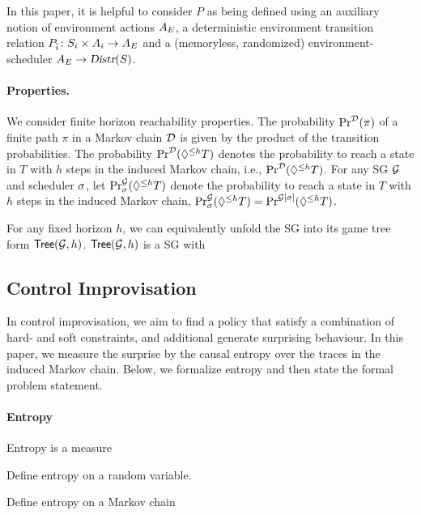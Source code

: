 In this paper, it is helpful to consider $P$ as being defined using an auxiliary notion of environment actions $A_E$, a deterministic environment transition relation $P_{\hat{i}}\colon S_i \times A_i \rightarrow A_E$ and a (memoryless, randomized) environment-scheduler $A_E \rightarrow \textsl{Distr}(S)$.

\paragraph{Properties.}
We consider finite horizon reachability properties.
The probability $\Pr^{\mathcal{D}}(\pi)$ of a finite path $\pi$ in a Markov chain $\mathcal{D}$ is given by the product of the transition probabilities. The probability $\Pr^{\mathcal{D}}(\lozenge^{\leq h} T)$ denotes the probability to reach a state in $T$ with $h$ steps in the induced Markov chain, i.e., $\Pr^{\mathcal{D}}(\lozenge^{\leq h} T)$.
For any SG $\mathcal{G}$ and scheduler $\sigma$, let $\Pr^{\mathcal{G}}_\sigma(\lozenge^{\leq h} T)$ denote the probability to reach a state in $T$ with $h$ steps in the induced Markov chain, $\Pr^{\mathcal{G}}_\sigma(\lozenge^{\leq h} T)= \Pr^{\mathcal{G}[\sigma]}(\lozenge^{\leq h} T)$.  

For any fixed horizon $h$, we can equivalently unfold the SG into its game tree form $\textsf{Tree}(\mathcal{G},h)$. $\textsf{Tree}(\mathcal{G},h)$ is a SG with 


\subsection{Control Improvisation}
In control improvisation, we aim to find a policy that satisfy a combination of hard- and soft constraints, and additional generate surprising behaviour. In this paper, we measure the surprise by the causal entropy over the traces in the induced Markov chain. Below, we formalize entropy and then state the formal problem statement. 
\paragraph{Entropy}
Entropy is a measure 

Define entropy on a random variable.

Define entropy on a Markov chain


